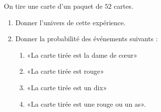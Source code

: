 
\begin{exercice}\label{exosmath-0187}

    On tire une carte d'un paquet de \( 52\) cartes.
    \begin{enumerate}
        \item
            Donner l'univers de cette expérience.
        \item
            Donner la probabilité des événements suivants :
            \begin{enumerate}
                \item
                    «La carte tirée est la dame de cœur» 
                \item
                    «La carte tirée est rouge» 
                \item
                    «La carte tirée est un dix» 
                \item
                    «La carte tirée est une rouge ou un as».
            \end{enumerate}
    \end{enumerate}

\end{exercice}
